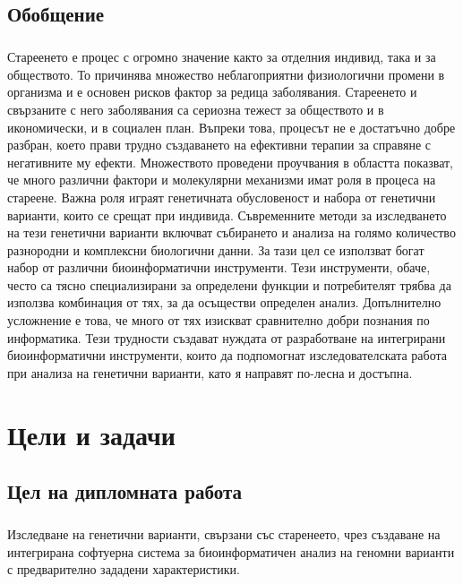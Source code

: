 \documentclass[pdftex,cyrillic,14pt,a4page,twoside,openright]{extreport}
\begin{document}
\section{Обобщение}
\paragraph{}
Стареенето е процес с огромно значение както за отделния индивид, така и за обществото. То причинява множество неблагоприятни физиологични промени в организма и е основен рисков фактор за редица заболявания. Стареенето и свързаните с него заболявания са сериозна тежест за обществото и в икономически, и в социален план. Въпреки това, процесът не е достатъчно добре разбран, което прави трудно създаването на ефективни терапии за справяне с негативните му ефекти. Множеството проведени проучвания в областта показват, че много различни фактори и молекулярни механизми имат роля в процеса на стареене. Важна роля играят генетичната обусловеност и набора от генетични варианти, които се срещат при индивида. Съвременните методи за изследването на тези генетични варианти включват събирането и анализа на голямо количество разнородни и комплексни биологични данни. За тази цел се използват богат набор от различни биоинформатични инструменти. Тези инструменти, обаче, често са тясно специализирани за определени функции и потребителят трябва да използва комбинация от тях, за да осъществи определен анализ. Допълнително усложнение е това, че много от тях изискват сравнително добри познания по информатика. Тези трудности създават нуждата от разработване на интегрирани биоинформатични инструменти, които да подпомогнат изследователската работа при анализа на генетични варианти, като я направят по-лесна и достъпна.


\chapter{Цели и задачи}

\section{Цел на дипломната работа}
\paragraph{}
Изследване на генетични варианти, свързани със старенеето, чрез създаване на интегрирана софтуерна система за биоинформатичен анализ на геномни варианти с предварително зададени характеристики.
\end{document}
